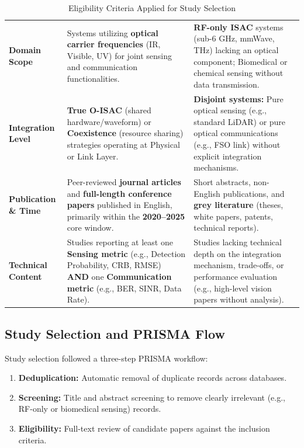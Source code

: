 \begin{table}[htbp]
\caption{Eligibility Criteria Applied for Study Selection}
\label{tab:iii1}
\centering
\setlength{\tabcolsep}{4pt}
\renewcommand{\arraystretch}{1.12}
\begin{tabularx}{\textwidth}{@{}L{2.6cm}Y Y@{}}
\toprule
{} &  &  \\
\midrule
\textbf{Domain Scope} & Systems utilizing \textbf{optical carrier frequencies} (IR, Visible, UV) for joint sensing and communication functionalities. & \textbf{RF-only ISAC} systems (sub-6 GHz, mmWave, THz) lacking an optical component; Biomedical or chemical sensing without data transmission. \\
\textbf{Integration Level} & \textbf{True O-ISAC} (shared hardware/waveform) or \textbf{Coexistence} (resource sharing) strategies operating at Physical or Link Layer. & \textbf{Disjoint systems:} Pure optical sensing (e.g., standard LiDAR) or pure optical communications (e.g., FSO link) without explicit integration mechanisms. \\
\textbf{Publication \& Time} & Peer-reviewed \textbf{journal articles} and \textbf{full-length conference papers} published in English, primarily within the \textbf{2020--2025} core window. & Short abstracts, non-English publications, and \textbf{grey literature} (theses, white papers, patents, technical reports). \\
\textbf{Technical Content} & Studies reporting at least one \textbf{Sensing metric} (e.g., Detection Probability, CRB, RMSE) \textbf{AND} one \textbf{Communication metric} (e.g., BER, SINR, Data Rate). & Studies lacking technical depth on the integration mechanism, trade-offs, or performance evaluation (e.g., high-level vision papers without analysis). \\
\bottomrule
\end{tabularx}
\end{table}

\subsection{Study Selection and PRISMA Flow}
Study selection followed a three-step PRISMA workflow:
\begin{enumerate}
    \item \textbf{Deduplication:} Automatic removal of duplicate records across databases.
    \item \textbf{Screening:} Title and abstract screening to remove clearly irrelevant (e.g., RF-only or biomedical sensing) records.
    \item \textbf{Eligibility:} Full-text review of candidate papers against the inclusion criteria.
\end{enumerate}

